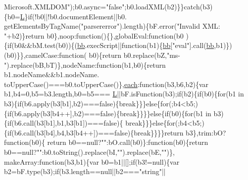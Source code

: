 \begin{DoxyCode}
{      Microsoft.XMLDOM"});b0.async=\textcolor{stringliteral}{"false"};b0.loadXML(b2)\}\}\textcolor{keywordflow}{catch}(b3)\{b0=\hyperlink{a00039_a38ee4c0b5f4fe2a18d0c783af540d253}{L}\}\textcolor{keywordflow}{if}(!b0||!b0.documentElement||b0.
      getElementsByTagName(\textcolor{stringliteral}{"parsererror"}).length)\{bF.error(\textcolor{stringliteral}{"Invalid XML: "}+b2)\}\textcolor{keywordflow}{return} b0\},noop:\textcolor{keyword}{function}()\{\},globalEval:\textcolor{keyword}{function}(b0
      )\{\textcolor{keywordflow}{if}(b0&&bM.test(b0))\{(\hyperlink{a00039_a1d6558865876e1c8cca029fce41a4bdb}{bb}.execScript||\textcolor{keyword}{function}(b1)\{\hyperlink{a00039_a1d6558865876e1c8cca029fce41a4bdb}{bb}[\textcolor{stringliteral}{"eval"}].call(\hyperlink{a00039_a1d6558865876e1c8cca029fce41a4bdb}{bb},b1)\})(b0)\}\},camelCase:\textcolor{keyword}{function}(
      b0)\{\textcolor{keywordflow}{return} b0.replace(bZ,\textcolor{stringliteral}{"ms-"}).replace(bB,bT)\},nodeName:\textcolor{keyword}{function}(b1,b0)\{\textcolor{keywordflow}{return} b1.nodeName&&b1.nodeName.
      toUpperCase()===b0.toUpperCase()\},\hyperlink{a00039_a871ff39db627c54c710a3e9909b8234c}{each}:\textcolor{keyword}{function}(b3,b6,b2)\{var b1,b4=0,b5=b3.length,b0=b5===
      \hyperlink{a00039_a38ee4c0b5f4fe2a18d0c783af540d253}{L}||bF.isFunction(b3);\textcolor{keywordflow}{if}(b2)\{\textcolor{keywordflow}{if}(b0)\{\textcolor{keywordflow}{for}(b1 in b3)\{\textcolor{keywordflow}{if}(b6.apply(b3[b1],b2)===\textcolor{keyword}{false})\{\textcolor{keywordflow}{break}\}\}\}\textcolor{keywordflow}{else}\{\textcolor{keywordflow}{for}(;b4<b5;)
      \{\textcolor{keywordflow}{if}(b6.apply(b3[b4++],b2)===\textcolor{keyword}{false})\{\textcolor{keywordflow}{break}\}\}\}\}\textcolor{keywordflow}{else}\{\textcolor{keywordflow}{if}(b0)\{\textcolor{keywordflow}{for}(b1 in b3)\{\textcolor{keywordflow}{if}(b6.call(b3[b1],b1,b3[b1])===\textcolor{keyword}{false})\{\textcolor{keywordflow}{
      break}\}\}\}\textcolor{keywordflow}{else}\{\textcolor{keywordflow}{for}(;b4<b5;)\{\textcolor{keywordflow}{if}(b6.call(b3[b4],b4,b3[b4++])===\textcolor{keyword}{false})\{\textcolor{keywordflow}{break}\}\}\}\}\textcolor{keywordflow}{return} b3\},trim:bO?\textcolor{keyword}{function}(b0)\{\textcolor{keywordflow}{
      return} b0==null?\textcolor{stringliteral}{""}:bO.call(b0)\}:\textcolor{keyword}{function}(b0)\{\textcolor{keywordflow}{return} b0==null?\textcolor{stringliteral}{""}:b0.toString().replace(bI,\textcolor{stringliteral}{""}).replace(bE,\textcolor{stringliteral}{""})\},
      makeArray:\textcolor{keyword}{function}(b3,b1)\{var b0=b1||[];\textcolor{keywordflow}{if}(b3!=null)\{var b2=bF.type(b3);\textcolor{keywordflow}{if}(b3.length==null||b2===\textcolor{stringliteral}{"string"}||

\end{DoxyCode}
